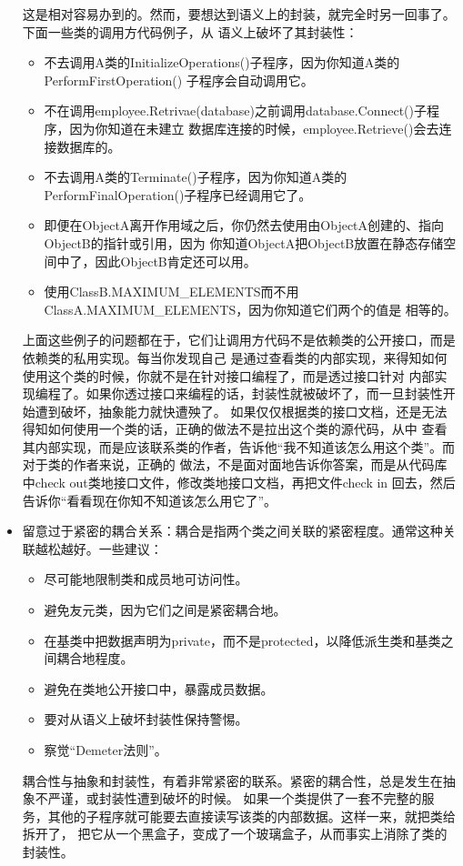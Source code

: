 \documentclass{article}
\begin{document}
\begin{itemize}
    这是相对容易办到的。然而，要想达到语义上的封装，就完全时另一回事了。下面一些类的调用方代码例子，从
    语义上破坏了其封装性：
    \begin{itemize}
        \item 不去调用A类的InitializeOperations()子程序，因为你知道A类的PerformFirstOperation()
        子程序会自动调用它。
        \item 不在调用employee.Retrivae(database)之前调用database.Connect()子程序，因为你知道在未建立
        数据库连接的时候，employee.Retrieve()会去连接数据库的。
        \item 不去调用A类的Terminate()子程序，因为你知道A类的PerformFinalOperation()子程序已经调用它了。
        \item 即便在ObjectA离开作用域之后，你仍然去使用由ObjectA创建的、指向ObjectB的指针或引用，因为
        你知道ObjectA把ObjectB放置在静态存储空间中了，因此ObjectB肯定还可以用。
        \item 使用ClassB.MAXIMUM\_ELEMENTS而不用ClassA.MAXIMUM\_ELEMENTS，因为你知道它们两个的值是
        相等的。
    \end{itemize}
    上面这些例子的问题都在于，它们让调用方代码不是依赖类的公开接口，而是依赖类的私用实现。每当你发现自己
    是通过查看类的内部实现，来得知如何使用这个类的时候，你就不是在针对接口编程了，而是透过接口针对
    内部实现编程了。如果你透过接口来编程的话，封装性就被破坏了，而一旦封装性开始遭到破坏，抽象能力就快遭殃了。
    如果仅仅根据类的接口文档，还是无法得知如何使用一个类的话，正确的做法不是拉出这个类的源代码，从中
    查看其内部实现，而是应该联系类的作者，告诉他“我不知道该怎么用这个类”。而对于类的作者来说，正确的
    做法，不是面对面地告诉你答案，而是从代码库中check out类地接口文件，修改类地接口文档，再把文件check in
    回去，然后告诉你“看看现在你知不知道该怎么用它了”。
    \item 留意过于紧密的耦合关系：耦合是指两个类之间关联的紧密程度。通常这种关联越松越好。一些建议：
    \begin{itemize}
        \item 尽可能地限制类和成员地可访问性。
        \item 避免友元类，因为它们之间是紧密耦合地。
        \item 在基类中把数据声明为private，而不是protected，以降低派生类和基类之间耦合地程度。
        \item 避免在类地公开接口中，暴露成员数据。
        \item 要对从语义上破坏封装性保持警惕。
        \item 察觉“Demeter法则”。
    \end{itemize}
    耦合性与抽象和封装性，有着非常紧密的联系。紧密的耦合性，总是发生在抽象不严谨，或封装性遭到破坏的时候。
    如果一个类提供了一套不完整的服务，其他的子程序就可能要去直接读写该类的内部数据。这样一来，就把类给拆开了，
    把它从一个黑盒子，变成了一个玻璃盒子，从而事实上消除了类的封装性。
\end{itemize}
\end{document}
